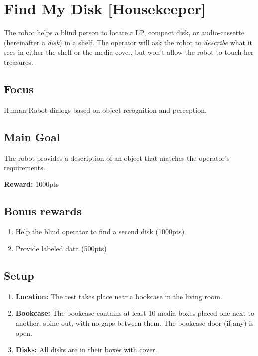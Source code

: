 \section{Find My Disk [Housekeeper]}
The robot helps a blind person to locate a LP, compact disk, or audio-cassette (hereinafter a \textit{disk}) in a shelf. The operator will ask the robot to \emph{describe} what it sees in either the shelf or the media cover, but won't allow the robot to touch her treasures.

\subsection*{Focus}
Human-Robot dialogs based on object recognition and perception.

\subsection*{Main Goal}
The robot provides a description of an object that matches the operator's requirements.

\noindent\textbf{Reward:} 1000pts\\

\subsection*{Bonus rewards}
\begin{enumerate}[nosep]
	\item Help the blind operator to find a second disk (1000pts)
	\item Provide labeled data (500pts)
\end{enumerate}

%
%
\subsection*{Setup}
\begin{enumerate}
	\item \textbf{Location:} The test takes place near a bookcase in the living room.

	\item \textbf{Bookcase:} The bookcase contains at least 10 media boxes placed one next to another, spine out, with no gaps between them. The bookcase door (if any) is open.

	\item \textbf{Disks:} All disks are in their boxes with cover.
\end{enumerate}


